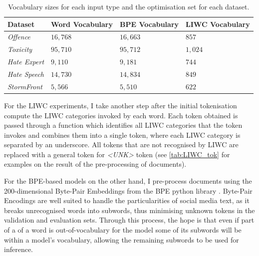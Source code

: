 \begin{table}[]
  \centering
  \begin{tabular}{llll}
    Dataset              & Word Vocabulary & BPE Vocabulary & LIWC Vocabulary \\\hline
    \textit{Offence}     & $16,768$        & $16,663$       & $857$           \\
    \textit{Toxicity}    & $95,710$        & $95,712$       & $1,024$         \\
    \textit{Hate Expert} & $9,110$         & $9,181$        & $744$           \\
    \textit{Hate Speech} & $14,730$        & $14,834$       & $849$           \\
    \textit{StormFront}  & $5,566$         & $5,510$        & $622$
  \end{tabular}
  \caption{Vocabulary sizes for each input type and the optimisation set for each dataset.}
  \label{tab:vocab_sizes}
\end{table}

For the LIWC experiments, I take another step after the initial tokenisation  compute the LIWC categories invoked by each word.
Each token obtained is passed through a function which identifies all LIWC categories that the token invokes and combines them into a single token, where each LIWC category is separated by an underscore.
All tokens that are not recognised by LIWC are replaced with a general token for \textit{<UNK>} token (see \cref{tab:LIWC_tok} for examples on the result of the pre-processing of documents).

For the BPE-based models on the other hand, I pre-process documents  using the 200-dimensional Byte-Pair Embeddings from the BPE python library \citep{Heinzerling:2018}.
Byte-Pair Encodings are well suited to handle the particularities of social media text, as it breaks unrecognised words into  subwords, thus minimising unknown tokens in the validation and evaluation sets.
Through this process, the hope is that even if part of a of a word is out-of-vocabulary for the model some of its subwords will be within a model's vocabulary, allowing the remaining subwords to be used for inference.

\begin{table}
  \centering
  \caption{Word token and BPE representation.}
  \label{tab:BPE_tok}
\end{table}

